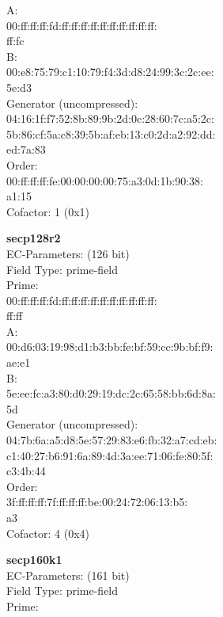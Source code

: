 A:   \\
    00:ff:ff:ff:fd:ff:ff:ff:ff:ff:ff:ff:ff:ff:ff:\\
    ff:fc\\
B:   \\
    00:e8:75:79:c1:10:79:f4:3d:d8:24:99:3c:2c:ee:\\
    5e:d3\\
Generator (uncompressed):\\
    04:16:1f:f7:52:8b:89:9b:2d:0c:28:60:7c:a5:2c:\\
    5b:86:cf:5a:c8:39:5b:af:eb:13:c0:2d:a2:92:dd:\\
    ed:7a:83\\
Order: \\
    00:ff:ff:ff:fe:00:00:00:00:75:a3:0d:1b:90:38:\\
    a1:15\\
Cofactor:  1 (0x1)\\
\item \textbf{ secp128r2 }\\
EC-Parameters: (126 bit)\\
Field Type: prime-field\\
Prime:\\
    00:ff:ff:ff:fd:ff:ff:ff:ff:ff:ff:ff:ff:ff:ff:\\
    ff:ff\\
A:   \\
    00:d6:03:19:98:d1:b3:bb:fe:bf:59:cc:9b:bf:f9:\\
    ae:e1\\
B:   \\
    5e:ee:fc:a3:80:d0:29:19:dc:2c:65:58:bb:6d:8a:\\
    5d\\
Generator (uncompressed):\\
    04:7b:6a:a5:d8:5e:57:29:83:e6:fb:32:a7:cd:eb:\\
    c1:40:27:b6:91:6a:89:4d:3a:ee:71:06:fe:80:5f:\\
    c3:4b:44\\
Order: \\
    3f:ff:ff:ff:7f:ff:ff:ff:be:00:24:72:06:13:b5:\\
    a3\\
Cofactor:  4 (0x4)\\
\item \textbf{ secp160k1 }\\
EC-Parameters: (161 bit)\\
Field Type: prime-field\\
Prime:\\
